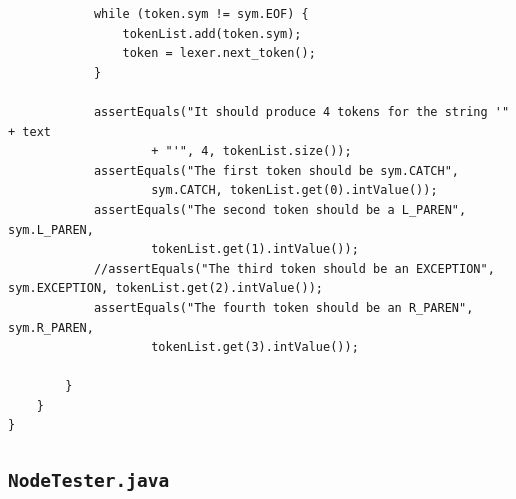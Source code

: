 \documentclass{report}
\begin{document}
\begin{verbatim}
			while (token.sym != sym.EOF) {
				tokenList.add(token.sym);
				token = lexer.next_token();
			}

			assertEquals("It should produce 4 tokens for the string '" + text
					+ "'", 4, tokenList.size());
			assertEquals("The first token should be sym.CATCH",
					sym.CATCH, tokenList.get(0).intValue());
			assertEquals("The second token should be a L_PAREN", sym.L_PAREN,
					tokenList.get(1).intValue());
			//assertEquals("The third token should be an EXCEPTION", sym.EXCEPTION, tokenList.get(2).intValue());
			assertEquals("The fourth token should be an R_PAREN", sym.R_PAREN,
					tokenList.get(3).intValue());

		}
	}
}

\end{verbatim}

\subsection{\texttt{NodeTester.java}}
\end{document}
